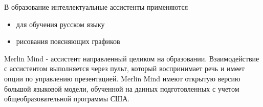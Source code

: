 В образование интеллектуальные ассистенты применяются \begin{itemize}
    \item  для обучения русском языку \cite{аль2019интеллектуальный}
    \item рисования поясняющих графиков \cite{bulusuautomated}
\end{itemize}



Merlin Mind - ассистент направленный целиком на образовании. Взаимодействие с ассистентом выполняется через пульт, который воспринимает речь и имеет опции по управлению презентацией.
Merlin Mind имеют открытую версию большой языковой модели, обученной на данных подготовленных с учетом общеобразовательной программы США.
